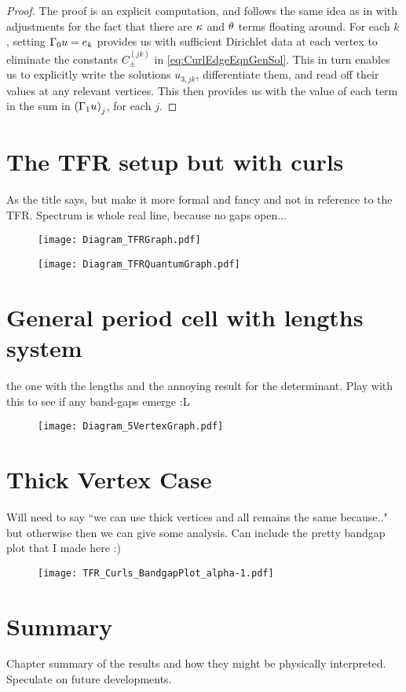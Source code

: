 \begin{proof}
	The proof is an explicit computation, and follows the same idea as in  with adjustments for the fact that there are $\kappa$ and $\theta$ terms floating around.
	For each $k$, setting $\Gamma_0 u = e_k$ provides us with sufficient Dirichlet data at each vertex to eliminate the constants $C^{(jk)}_{\pm}$ in \eqref{eq:CurlEdgeEqnGenSol}.
	This in turn enables us to explicitly write the solutions $u_{3,jk}$, differentiate them, and read off their values at any relevant vertices.
	This then provides us with the value of each term in the sum in $\left( \Gamma_1 u \right)_j$, for each $j$.
\end{proof}

\section{The TFR setup but with curls}
As the title says, but make it more formal and fancy and not in reference to the TFR. 
Spectrum is whole real line, because no gaps open...
\begin{figure}[h]
	\centering
	\texttt{[image: Diagram\_TFRGraph.pdf]}
	\caption{\label{fig:Diagram_TFRGraph}}
\end{figure}
\begin{figure}[h]
	\centering
	\texttt{[image: Diagram\_TFRQuantumGraph.pdf]}
	\caption{\label{fig:Diagram_TFRQuantumGraph}}
\end{figure}

\section{General period cell with lengths system}
the one with the lengths and the annoying result for the determinant.
Play with this to see if any band-gaps emerge :L
\begin{figure}[h]
	\centering
	\texttt{[image: Diagram\_5VertexGraph.pdf]}
	\caption{\label{fig:Diagram_5VertexGraph}}
\end{figure}

\section{Thick Vertex Case}
Will need to say ``we can use thick vertices and all remains the same because.." but otherwise then we can give some analysis.
Can include the pretty bandgap plot that I made here :)
\begin{figure}[h]
	\centering
	\texttt{[image: TFR\_Curls\_BandgapPlot\_alpha-1.pdf]}
	\caption{\label{fig:TFR_Curls_BandgapPlot_alpha-1}}
\end{figure}

\section{Summary}
Chapter summary of the results and how they might be physically interpreted.
Speculate on future developments.